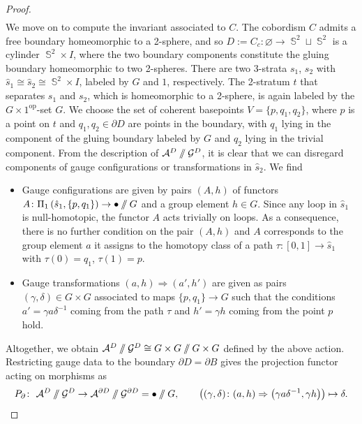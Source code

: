 \documentclass[10pt,a4paper]{amsart}
\DeclareMathOperator{\Sp}{\mathbb{S}}
\newcommand{\sslash}{\mathbin{/\mkern-6mu/}}
\numberwithin{equation}{section}
\theoremstyle{definition}
\begin{document}
\begin{proof}
\begin{align*}
 \end{align*}
 We move on to compute the invariant associated to $C$. The cobordism $C$ admits a free boundary homeomorphic to a 2-sphere, and so $D := C_c\colon \varnothing \rightarrow \Sp^2 \sqcup \Sp^2$ is a cylinder $\Sp^2 \times I$, where the two boundary components constitute the gluing boundary homeomorphic to two 2-spheres. There are two 3-strata $s_1$, $s_2$ with $\hat{s}_1 \cong \hat{s}_2 \cong \Sp^2 \times I$, labeled by $G$ and $1$, respectively. The 2-stratum $t$ that separates $s_1$ and $s_2$, which is homeomorphic to a 2-sphere, is again labeled by the $G \times 1^{\mathrm{op}}$-set $G$. We choose the set of coherent basepoints $V = \{p,q_1, q_2\}$, where $p$ is a point on $t$ and $q_1, q_2 \in \partial D$ are points in the boundary, with $q_1$ lying in the component of the gluing boundary labeled by $G$ and $q_2$ lying in the trivial component. From the description of $\mathcal{A}^{D} \sslash \mathcal{G}^{D}$, it is clear that we can disregard components of gauge configurations or transformations in $\hat{s}_2$. We find
 \begin{itemize}\itemsep=0pt
 \item Gauge configurations are given by pairs $(A, h)$ of functors $A\colon \Pi_1\left(\hat{s}_1, \{p,q_1\}\right) \rightarrow \bullet \sslash G$ and a group element $h \in G$. Since any loop in $\hat{s}_1$ is null-homotopic, the functor $A$ acts trivially on loops. As a consequence, there is no further condition on the pair $(A,h)$ and $A$ corresponds to the group element $a$ it assigns to the homotopy class of a path $\tau\colon [0,1] \rightarrow \hat{s}_1$ with $\tau(0) = q_1$, $\tau(1) = p$.
 \item Gauge transformations $(a, h) \Rightarrow (a', h')$ are given as pairs $(\gamma, \delta) \in G \times G$ associated to maps $\{p, q_1\} \rightarrow G$ such that the conditions $a' = \gamma a \delta^{-1}$ coming from the path $\tau$ and $h' = \gamma h$ coming from the point $p$ hold.
 \end{itemize}
 Altogether, we obtain $\mathcal{A}^{ D} \sslash \mathcal{G}^{ D} \cong G \times G \sslash G \times G$ defined by the above action. Restricting gauge data to the boundary $\partial D = \partial B$ gives the projection functor acting on morphisms as
 \begin{align*}
 P_{\partial}\colon \ \mathcal{A}^{ D} \sslash \mathcal{G}^{ D} \rightarrow \mathcal{A}^{ \partial D} \sslash \mathcal{G}^{\partial D} = \bullet \sslash G, \qquad \bigl((\gamma, \delta)\colon (a, h) \Rightarrow \bigl(\gamma a\delta^{-1}, \gamma h\bigr)\bigr) \mapsto \delta.

\end{align*}
\end{proof}
\end{document}
